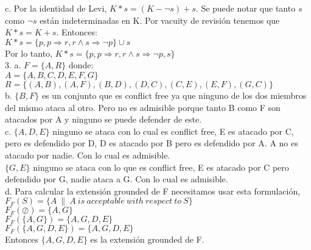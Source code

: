 c. Por la identidad de Levi, $K*s = (K - \neg s) + s$. Se puede notar que tanto $s$ como $\neg s$ están indeterminadas en K. Por vacuity de revisión tenemos que $K*s = K+s$. Entonces: \\

$K*s = \{p, p \Longrightarrow r , r \land s \Longrightarrow \neg p \} \cup {s} $\\

Por lo tanto, $K*s = \{p, p \Longrightarrow r , r \land s \Longrightarrow \neg p, s \}$ \\

3. a. $F=\{A, R\}$ donde: \\
$A=\{A, B, C, D, E, F, G\}$ \\
$R=\{(A, B), (A, F), (B, D), (D, C), (C, E), (E, F), (G, C)\}$ \\

b. $\{B, F\}$ es un conjunto que es conflict free ya que ninguno de los dos miembros del mismo ataca al otro. Pero no es admisible porque tanto B como F son atacados por A y ninguno se puede defender de este.\\

c. $\{A, D, E\}$ ninguno se ataca con lo cual es conflict free, E es atacado por C, pero es defendido por D, D es atacado por B pero es defendido por A. A no es atacado por nadie. Con lo cual es admisible. \\

$\{G, E\}$ ninguno se ataca con lo que es conflict free, E es atacado por C pero defendido por G, nadie ataca a G. Con lo cual es admisible. \\

d. Para calcular la extensión grounded de F necesitamos usar esta formulación, $F_{F} (S) = \{ A\ \| \ A\ is\ acceptable\ with\ respect\ to\ S \}$ \\

$F_{F} (\oslash) = \{A, G\}$ \\

$F_{F} (\{A, G\}) = \{A, G, D, E\}$ \\

$F_{F} (\{A, G, D, E\}) = \{A, G, D, E\}$ \\

Entonces $\{A, G, D, E\}$ es la extensión grounded de F.

\bigskip